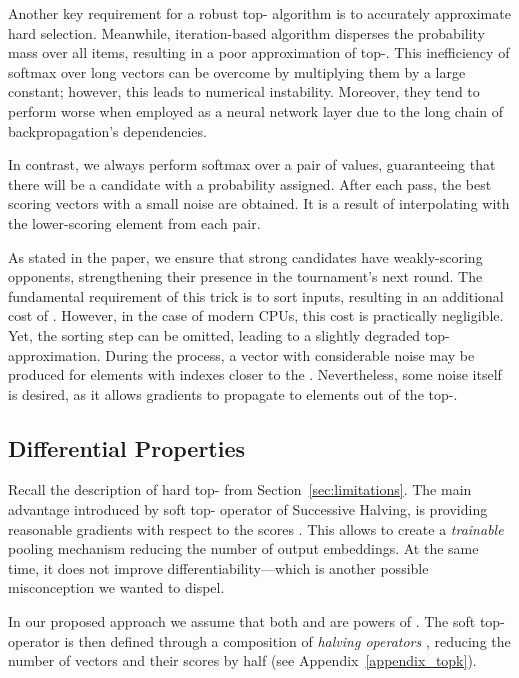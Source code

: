 \documentclass{article}
\begin{document}
Another key requirement for a robust top- algorithm is to accurately approximate hard selection.
Meanwhile, iteration-based algorithm disperses the probability mass over all items, resulting in a poor approximation of top-. This inefficiency of softmax over long vectors can be overcome by multiplying them by a large constant; however, this leads to numerical instability. 
Moreover, they tend to perform worse when employed as a neural network layer due to the long chain of backpropagation's dependencies.

In contrast, we always perform softmax over a pair of values, guaranteeing that there will be a candidate with a  probability assigned. After each pass, the best scoring  vectors with a small noise are obtained. It is a result of interpolating with the lower-scoring element from each pair. 

As stated in the paper, we ensure that strong candidates have weakly-scoring opponents, strengthening their presence in the tournament's next round. The fundamental requirement of this trick is to sort inputs, resulting in an additional cost of . However, in the case of modern CPUs, this cost is practically negligible. Yet, the sorting step can be omitted, leading to a slightly degraded top- approximation. 
During the process, a vector with considerable noise may be produced for elements with indexes closer to the . Nevertheless, some noise itself is desired, as it allows gradients to propagate to elements out of the top-.


\subsection{Differential Properties\label{sec:k2properties}}

Recall the description of hard top- from Section~\ref{sec:limitations}. The main advantage introduced by soft top- operator of Successive Halving, is providing reasonable gradients with respect to the scores . This allows to create a \emph{trainable} pooling mechanism reducing the number of output embeddings. At the same time, it does not improve differentiability---which is another possible misconception we wanted to dispel.



In our proposed approach we assume that both  and  are powers of . The soft top- operator is then defined through a composition of  \emph{halving operators} , reducing the number of vectors and their scores by half (see Appendix~\ref{appendix_topk}).
\end{document}
